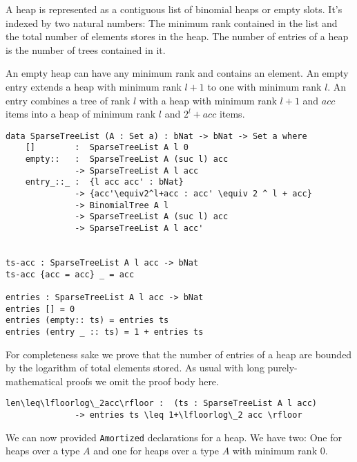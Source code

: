A heap is represented as a contiguous list of binomial heaps or empty slots. It's indexed by two natural numbers: The minimum rank contained in the list and the total number of elements stores in the heap. The number of entries of a heap is the number of trees contained in it.

An empty heap can have any minimum rank and contains an element. An empty entry extends a heap with minimum rank $l+1$ to one with minimum rank $l$. An entry combines a tree of rank $l$ with a heap with minimum rank $l+1$ and $acc$ items into a heap of minimum rank $l$ and $2^l + acc$ items.

\begin{lstlisting}[caption={Definition of a binomial heap},label={lst:binomial:heap},emph={SparseTreeList,empty,entry,BinomialTree,entries}]
data SparseTreeList (A : Set a) : bNat -> bNat -> Set a where
    []        :  SparseTreeList A l 0
    empty::   :  SparseTreeList A (suc l) acc
              -> SparseTreeList A l acc
    entry_::_ :  {l acc acc' : bNat}
              -> {acc'\equiv2^l+acc : acc' \equiv 2 ^ l + acc}
              -> BinomialTree A l
              -> SparseTreeList A (suc l) acc
              -> SparseTreeList A l acc'


ts-acc : SparseTreeList A l acc -> bNat
ts-acc {acc = acc} _ = acc

entries : SparseTreeList A l acc -> bNat
entries [] = 0
entries (empty:: ts) = entries ts
entries (entry _ :: ts) = 1 + entries ts
\end{lstlisting}

For completeness sake we prove that the number of entries of a heap are bounded by the logarithm of total elements stored. As usual with long purely-mathematical proofs we omit the proof body here.

\begin{lstlisting}[caption={The length of a heap is bounded},label={lst:binomial:bounded},emph={SparseTreeList, entries}]
len\leq\lfloorlog\_2acc\rfloor :  (ts : SparseTreeList A l acc)
              -> entries ts \leq 1+\lfloorlog\_2 acc \rfloor
\end{lstlisting}

We can now provided \texttt{Amortized} declarations for a heap. We have two: One for heaps over a type $A$ and one for heaps over a type $A$ with minimum rank $0$.

